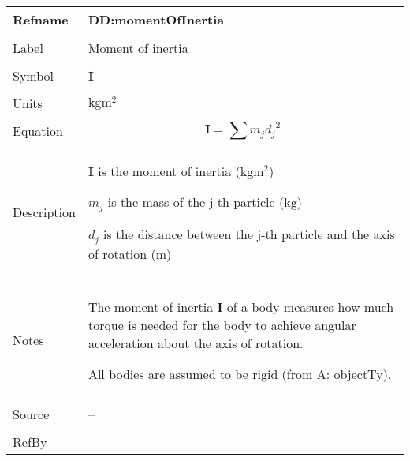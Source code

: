 \documentclass[12pt]{article}
\begin{document}
\begin{minipage}{\textwidth}
\begin{tabular}{>{\raggedright}p{}>{\raggedright\arraybackslash}p{}}
\toprule \textbf{Refname} & \textbf{DD:momentOfInertia}
\label{DD:momentOfInertia}
\\ \midrule \\
Label & Moment of inertia
        
\\ \midrule \\
Symbol & $\mathbf{I}$
         
\\ \midrule \\
Units & $\text{kg}\text{m}^{2}$
        
\\ \midrule \\
Equation & \begin{displaymath}
           \mathbf{I}=\displaystyle\sum{{m_{j}} {d_{j}}^{2}}
           \end{displaymath}
\\ \midrule \\
Description & \begin{symbDescription}
              \item{$\mathbf{I}$ is the moment of inertia ($\text{kg}\text{m}^{2}$)}
              \item{${m_{j}}$ is the mass of the j-th particle (${\text{kg}}$)}
              \item{${d_{j}}$ is the distance between the j-th particle and the axis of rotation (${\text{m}}$)}
              \end{symbDescription}
\\ \midrule \\
Notes & The moment of inertia $\mathbf{I}$ of a body measures how much torque is needed for the body to achieve angular acceleration about the axis of rotation.
        
        All bodies are assumed to be rigid (from \hyperref[assumpOT]{A: objectTy}).
        
\\ \midrule \\
Source & --
         
\\ \midrule \\
RefBy & 
\\ \bottomrule
\end{tabular}
\end{minipage}
\end{document}
